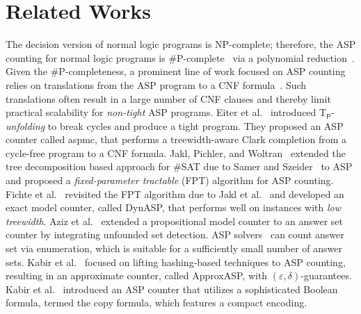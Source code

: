 \section{Related Works}
\label{section:relatedwork}
The decision version of normal logic programs is NP-complete; therefore, the ASP counting for normal logic programs is \#P-complete~\cite{valiant1979} via a polynomial reduction~\cite{JN2011}.  Given the \#P-completeness, a prominent line of work focused on ASP counting relies on translations from the ASP program to a CNF formula~\cite{LZ2004,Janhunen2004,Janhunen2006,JN2011}. Such translations often result in a large number of CNF clauses and thereby limit practical scalability for {\em non-tight} ASP programs. 
Eiter et al.~\cite{EHK2024} introduced T$_{\mathsf{P}}$-\textit{unfolding} to break cycles and produce a tight program. They proposed an ASP counter called aspmc, that performs a treewidth-aware Clark completion from a cycle-free program to a CNF formula. Jakl, Pichler, and Woltran~\cite{JPW09} extended the tree decomposition based approach for \#SAT due to Samer and Szeider~\cite{SS2010} to ASP and proposed a {\em fixed-parameter tractable} (FPT) algorithm for ASP counting. 
Fichte et al.~\cite{FHMW2017,FH2019} revisited the FPT algorithm due to Jakl et al.~\cite{JPW09}  and developed an exact model counter, called DynASP, that performs well on instances with {\em low treewidth}. 
Aziz et al.~\cite{ACMS2015} extended a propositional model counter to an answer set counter by integrating unfounded set detection. 
ASP solvers~\cite{GKS2012} can count answer set via enumeration, which is suitable for a sufficiently small number of answer sets.
Kabir et al.~\cite{KESHFM2022} focused on lifting hashing-based techniques to ASP counting, resulting in an approximate counter, called ApproxASP, with $(\varepsilon,\delta)$-guarantees. 
Kabir et al.~\cite{KCM2024} introduced an ASP counter that utilizes a sophisticated Boolean formula, termed the copy formula, which features a compact encoding.
